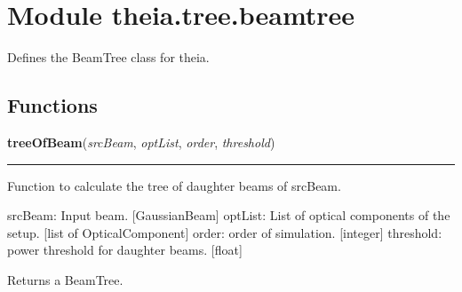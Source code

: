 %
%
%


\section{Module theia.tree.beamtree}

    \label{theia:tree:beamtree}
Defines the BeamTree class for theia.



  \subsection{Functions}

    \label{theia:tree:beamtree:treeOfBeam}

    \vspace{0.5ex}

\hspace{.8\funcindent}\begin{boxedminipage}{\funcwidth}

    \raggedright \textbf{treeOfBeam}(\textit{srcBeam}, \textit{optList}, \textit{order}, \textit{threshold})

    \vspace{-1.5ex}

    \rule{\textwidth}{0.5\fboxrule}
\setlength{\parskip}{2ex}
    Function to calculate the tree of daughter beams of srcBeam.

    srcBeam: Input beam. [GaussianBeam] optList: List of optical components
    of the setup. [list of OpticalComponent] order: order of simulation. 
    [integer] threshold: power threshold for daughter beams. [float]

    Returns a BeamTree.

\setlength{\parskip}{1ex}
    \end{boxedminipage}


